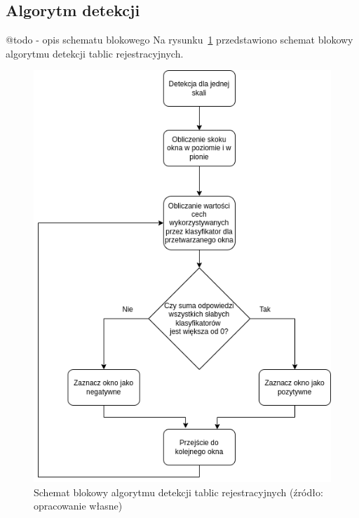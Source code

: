 \subsection{Algorytm detekcji}
@todo - opis schematu blokowego
Na rysunku~\ref{fig:detection_alg} przedstawiono schemat blokowy algorytmu detekcji tablic rejestracyjnych.
\begin{figure}[!ht]
    \centering
    \includegraphics[scale=0.4]{Pictures/detection_alg}
    \caption{Schemat blokowy algorytmu detekcji tablic rejestracyjnych (źródło: opracowanie własne)}
    \label{fig:detection_alg}
\end{figure}
\FloatBarrier

